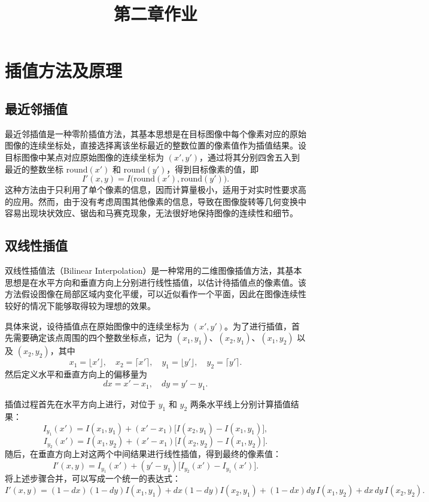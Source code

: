 \documentclass[UTF8]{ctexart}
\begin{document}
\title{第二章作业}
\maketitle

\section{插值方法及原理}

\subsection{最近邻插值}  
最近邻插值是一种零阶插值方法，其基本思想是在目标图像中每个像素对应的原始图像的连续坐标处，直接选择离该坐标最近的整数位置的像素值作为插值结果。设目标图像中某点对应原始图像的连续坐标为 \((x', y')\)，通过将其分别四舍五入到最近的整数坐标 \(\text{round}(x')\) 和 \(\text{round}(y')\)，得到目标像素的值，即  
\[
I'(x, y) = I\big(\text{round}(x'), \text{round}(y')\big).
\]
这种方法由于只利用了单个像素的信息，因而计算量极小，适用于对实时性要求高的应用。然而，由于没有考虑周围其他像素的信息，导致在图像旋转等几何变换中容易出现块状效应、锯齿和马赛克现象，无法很好地保持图像的连续性和细节。

\subsection{双线性插值}  
双线性插值法（Bilinear Interpolation）是一种常用的二维图像插值方法，其基本思想是在水平方向和垂直方向上分别进行线性插值，以估计待插值点的像素值。该方法假设图像在局部区域内变化平缓，可以近似看作一个平面，因此在图像连续性较好的情况下能够取得较为理想的效果。

具体来说，设待插值点在原始图像中的连续坐标为 \((x', y')\)。为了进行插值，首先需要确定该点周围的四个整数坐标点，记为 \((x_1, y_1)\)、\((x_2, y_1)\)、\((x_1, y_2)\) 以及 \((x_2, y_2)\)，其中  
\[
x_1 = \lfloor x' \rfloor,\quad x_2 = \lceil x' \rceil,\quad y_1 = \lfloor y' \rfloor,\quad y_2 = \lceil y' \rceil.
\]
然后定义水平和垂直方向上的偏移量为  
\[
dx = x' - x_1,\quad dy = y' - y_1.
\]

插值过程首先在水平方向上进行，对位于 \(y_1\) 和 \(y_2\) 两条水平线上分别计算插值结果：
\[
I_{y_1}(x') = I(x_1, y_1) + (x' - x_1) \big[I(x_2, y_1) - I(x_1, y_1)\big],
\]
\[
I_{y_2}(x') = I(x_1, y_2) + (x' - x_1) \big[I(x_2, y_2) - I(x_1, y_2)\big].
\]
随后，在垂直方向上对这两个中间结果进行线性插值，得到最终的像素值：
\[
I'(x, y) = I_{y_1}(x') + (y' - y_1) \big[I_{y_2}(x') - I_{y_1}(x')\big].
\]
将上述步骤合并，可以写成一个统一的表达式：
\[
I'(x, y) = (1 - dx)(1 - dy) I(x_1, y_1) + dx(1 - dy) I(x_2, y_1) + (1 - dx)dy\, I(x_1, y_2) + dx\,dy\, I(x_2, y_2).
\]
\end{document}
